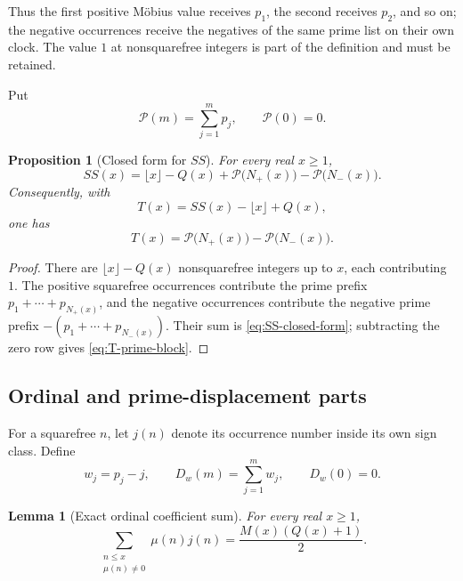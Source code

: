 \documentclass[11pt]{amsart}
\numberwithin{equation}{section}
\theoremstyle{plain}
\newtheorem{proposition}[theorem]{Proposition}
\newtheorem{lemma}[theorem]{Lemma}
\theoremstyle{definition}
\theoremstyle{remark}
\newcommand{\calP}{\mathcal P}
\begin{document}
Thus the first positive M\"obius value receives $p_1$, the second receives
$p_2$, and so on; the negative occurrences receive the negatives of the same
prime list on their own clock.  The value $1$ at nonsquarefree integers is part
of the definition and must be retained.

Put
\begin{equation}
\calP(m)=\sum_{j=1}^{m}p_j,
\qquad \calP(0)=0.
\label{eq:prime-prefix-definition}
\end{equation}

\begin{proposition}[Closed form for $SS$]
\label{prop:SS-closed-form}
For every real $x\ge1$,
\begin{equation}
SS(x)=\lfloor x\rfloor-Q(x)
+\calP\bigl(N_+(x)\bigr)-\calP\bigl(N_-(x)\bigr).
\label{eq:SS-closed-form}
\end{equation}
Consequently, with
\begin{equation}
T(x)=SS(x)-\lfloor x\rfloor+Q(x),
\label{eq:T-definition}
\end{equation}
one has
\begin{equation}
T(x)=\calP\bigl(N_+(x)\bigr)-\calP\bigl(N_-(x)\bigr).
\label{eq:T-prime-block}
\end{equation}
\end{proposition}

\begin{proof}
There are $\lfloor x\rfloor-Q(x)$ nonsquarefree integers up to $x$, each
contributing $1$.  The positive squarefree occurrences contribute the prime
prefix $p_1+\cdots+p_{N_+(x)}$, and the negative occurrences contribute the
negative prime prefix $-(p_1+\cdots+p_{N_-(x)})$.  Their sum is
\eqref{eq:SS-closed-form}; subtracting the zero row gives
\eqref{eq:T-prime-block}.
\end{proof}

\subsection{Ordinal and prime-displacement parts}
\label{subsec:ordinal-displacement}

For a squarefree $n$, let $j(n)$ denote its occurrence number inside its own
sign class.  Define
\begin{equation}
w_j=p_j-j,\qquad
D_w(m)=\sum_{j=1}^{m}w_j,\qquad D_w(0)=0.
\label{eq:w-Dw-definition}
\end{equation}

\begin{lemma}[Exact ordinal coefficient sum]
\label{lem:ordinal-coefficient-sum}
For every real $x\ge1$,
\begin{equation}
\sum_{\substack{n\le x\\ \mu(n)\ne0}}
\mu(n)j(n)=\frac{M(x)(Q(x)+1)}2.
\label{eq:ordinal-coefficient-sum}
\end{equation}
\end{lemma}
\end{document}
